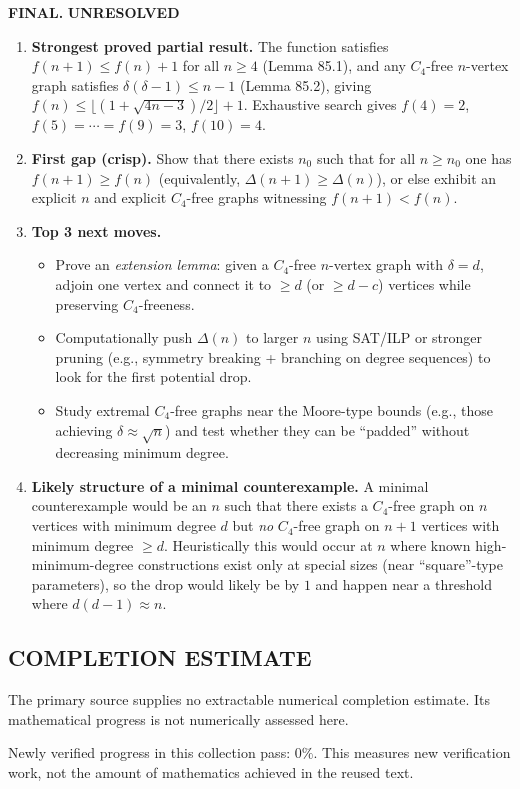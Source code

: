 \medskip
\noindent\textbf{FINAL.} \textbf{UNRESOLVED}
\begin{enumerate}
\item[(i)] \textbf{Strongest proved partial result.}
The function satisfies $f(n+1)\le f(n)+1$ for all $n\ge 4$ (Lemma 85.1), and any $C_4$-free $n$-vertex graph satisfies $\delta(\delta-1)\le n-1$ (Lemma 85.2), giving $f(n)\le \lfloor(1+\sqrt{4n-3})/2\rfloor+1$. Exhaustive search gives $f(4)=2$, $f(5)=\cdots=f(9)=3$, $f(10)=4$.
\item[(ii)] \textbf{First gap (crisp).}
Show that there exists $n_0$ such that for all $n\ge n_0$ one has $f(n+1)\ge f(n)$ (equivalently, $\Delta(n+1)\ge \Delta(n)$), or else exhibit an explicit $n$ and explicit $C_4$-free graphs witnessing $f(n+1)<f(n)$.
\item[(iii)] \textbf{Top 3 next moves.}
\begin{itemize}
\item Prove an \emph{extension lemma}: given a $C_4$-free $n$-vertex graph with $\delta=d$, adjoin one vertex and connect it to $\ge d$ (or $\ge d-c$) vertices while preserving $C_4$-freeness.
\item Computationally push $\Delta(n)$ to larger $n$ using SAT/ILP or stronger pruning (e.g., symmetry breaking + branching on degree sequences) to look for the first potential drop.
\item Study extremal $C_4$-free graphs near the Moore-type bounds (e.g., those achieving $\delta\approx\sqrt n$) and test whether they can be ``padded'' without decreasing minimum degree.
\end{itemize}
\item[(iv)] \textbf{Likely structure of a minimal counterexample.}
A minimal counterexample would be an $n$ such that there exists a $C_4$-free graph on $n$ vertices with minimum degree $d$ but \emph{no} $C_4$-free graph on $n+1$ vertices with minimum degree $\ge d$. Heuristically this would occur at $n$ where known high-minimum-degree constructions exist only at special sizes (near ``square''-type parameters), so the drop would likely be by $1$ and happen near a threshold where $d(d-1)\approx n$.
\end{enumerate}




\subsection*{COMPLETION ESTIMATE}
The primary source supplies no extractable numerical completion estimate. Its mathematical progress is not numerically assessed here.

Newly verified progress in this collection pass: $0\%$. This measures new verification work, not the amount of mathematics achieved in the reused text.
